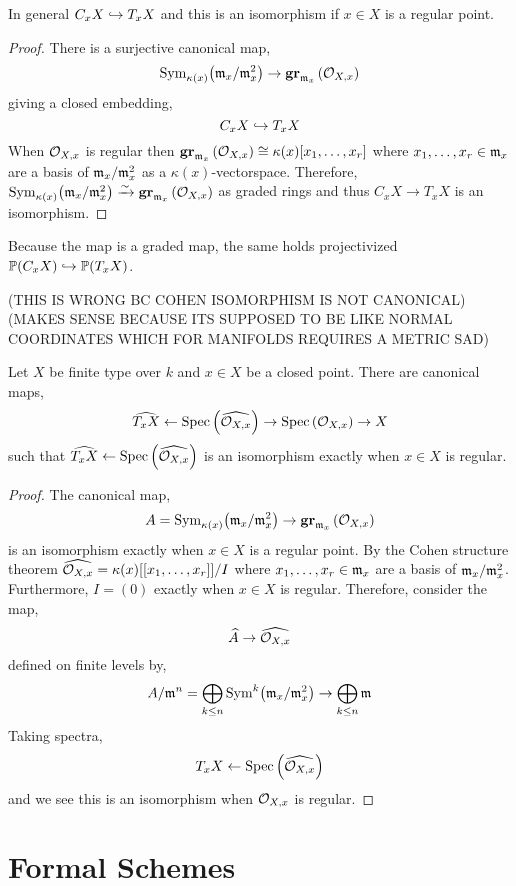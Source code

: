 \documentclass[12pt]{article}
\begin{document}
\begin{prop}
In general $C_x X \hookrightarrow T_x X$ and this is an isomorphism if $x \in X$ is a regular point.
\end{prop}

\begin{proof}
There is a surjective canonical map,
\[ \mathrm{Sym}_{\kappa(x)}\! \left( \mathfrak{m}_x/\mathfrak{m}_x^2 \right) \to \mathbf{gr}_{\mathfrak{m}_x}\left(\mathcal{O}_{X, x}\right) \]
giving a closed embedding,
\[ C_x X \hookrightarrow T_x X \]
When $\mathcal{O}_{X, x}$ is regular then $\mathbf{gr}_{\mathfrak{m}_x}\left(\mathcal{O}_{X, x}\right) \cong \kappa(x)[x_1, \dots, x_r]$ where $x_1, \dots, x_r \in \mathfrak{m}_x$ are a basis of $\mathfrak{m}_x / \mathfrak{m}_x^2$ as a $\kappa(x)$-vectorspace. Therefore,  $\mathrm{Sym}_{\kappa(x)}\! \left( \mathfrak{m}_x / \mathfrak{m}_x^2 \right) \xrightarrow{\sim} \mathbf{gr}_{\mathfrak{m}_x}\left(\mathcal{O}_{X, x}\right)$ as graded rings and thus $C_x X \to T_x X$ is an isomorphism.
\end{proof}

\begin{rmk}
Because the map is a graded map, the same holds projectivized $\mathbb{P}(C_x X) \hookrightarrow \mathbb{P}(T_x X)$.
\end{rmk}

(THIS IS WRONG BC COHEN ISOMORPHISM IS NOT CANONICAL)
(MAKES SENSE BECAUSE ITS SUPPOSED TO BE LIKE NORMAL COORDINATES WHICH FOR MANIFOLDS REQUIRES A METRIC SAD)

\begin{prop}
Let $X$ be finite type over $k$ and $x \in X$ be a closed point. There are canonical maps,
\[ \widehat{T_x X} \leftarrow \mathrm{Spec}\left( \widehat{\mathcal{O}_{X, x}} \right) \to \mathrm{Spec}\left( \mathcal{O}_{X, x} \right) \to X \]
such that $\widehat{T_x X} \leftarrow \mathrm{Spec}\left( \widehat{\mathcal{O}_{X, x}} \right)$ is an isomorphism exactly when $x \in X$ is regular.
\end{prop}

\begin{proof}
The canonical map,
\[ A = \mathrm{Sym}_{\kappa(x)}\! \left( \mathfrak{m}_x/\mathfrak{m}_x^2 \right) \to \mathbf{gr}_{\mathfrak{m}_x}\left(\mathcal{O}_{X, x}\right) \]
is an isomorphism exactly when $x \in X$ is a regular point. By the Cohen structure theorem $\widehat{\mathcal{O}_{X, x}} = \kappa(x)[[x_1, \dots, x_r]] / I$ where $x_1, \dots, x_r \in \mathfrak{m}_x$ are a basis of $\mathfrak{m}_x / \mathfrak{m}_x^2$. Furthermore, $I = (0)$ exactly when $x \in X$ is regular. Therefore, consider the map,
\[ \widehat{A} \to \widehat{\mathcal{O}_{X, x}} \]
defined on finite levels by,
\[ A / \mathfrak{m}^n = \bigoplus_{k \le n} \mathrm{Sym}^{k}\! \left( \mathfrak{m}_x / \mathfrak{m}_x^2 \right) \to \bigoplus_{k \le n} \mathfrak{m} \]
Taking spectra,
\[ T_x X \leftarrow \mathrm{Spec}\left( \widehat{\mathcal{O}_{X, x}} \right) \]
and we see this is an isomorphism when $\mathcal{O}_{X, x}$ is regular.
\end{proof}

\section{Formal Schemes}
\end{document}
